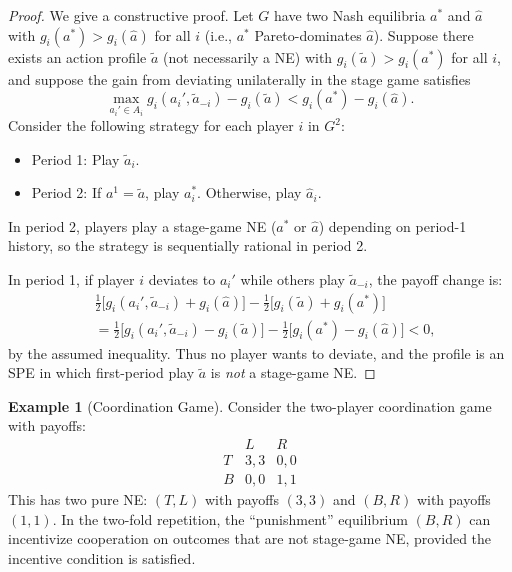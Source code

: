 \documentclass[11pt,a4paper]{article}
\theoremstyle{definition}
\newtheorem{example}{Example}[section]
\theoremstyle{plain}
\theoremstyle{remark}
\begin{document}
\begin{proof}
We give a constructive proof. Let $G$ have two Nash equilibria $a^*$ and $\hat{a}$ with
$g_i(a^*) > g_i(\hat{a})$ for all $i$ (i.e., $a^*$ Pareto-dominates $\hat{a}$). Suppose
there exists an action profile $\tilde{a}$ (not necessarily a NE) with
$g_i(\tilde{a}) > g_i(a^*)$ for all $i$, and suppose the gain from deviating unilaterally
in the stage game satisfies
\[
    \max_{a_i' \in A_i} g_i(a_i', \tilde{a}_{-i}) - g_i(\tilde{a})
    < g_i(a^*) - g_i(\hat{a}).
\]
Consider the following strategy for each player $i$ in $G^2$:
\begin{itemize}
    \item Period 1: Play $\tilde{a}_i$.
    \item Period 2: If $a^1 = \tilde{a}$, play $a_i^*$. Otherwise, play $\hat{a}_i$.
\end{itemize}

In period 2, players play a stage-game NE ($a^*$ or $\hat{a}$) depending on period-1
history, so the strategy is sequentially rational in period 2.

In period 1, if player $i$ deviates to $a_i'$ while others play $\tilde{a}_{-i}$, the
payoff change is:
\begin{align*}
    &\frac{1}{2}\bigl[g_i(a_i', \tilde{a}_{-i}) + g_i(\hat{a})\bigr]
    - \frac{1}{2}\bigl[g_i(\tilde{a}) + g_i(a^*)\bigr] \\
    &= \frac{1}{2}\bigl[g_i(a_i', \tilde{a}_{-i}) - g_i(\tilde{a})\bigr]
    - \frac{1}{2}\bigl[g_i(a^*) - g_i(\hat{a})\bigr] < 0,
\end{align*}
by the assumed inequality. Thus no player wants to deviate, and the profile is an SPE
in which first-period play $\tilde{a}$ is \emph{not} a stage-game NE.
\end{proof}

\begin{example}[Coordination Game]
\label{ex:coordination-repeated}
Consider the two-player coordination game with payoffs:
\[
\begin{array}{c|cc}
  & L & R \\ \hline
T & 3,3 & 0,0 \\
B & 0,0 & 1,1
\end{array}
\]
This has two pure NE: $(T,L)$ with payoffs $(3,3)$ and $(B,R)$ with payoffs $(1,1)$.
In the two-fold repetition, the ``punishment'' equilibrium $(B,R)$ can incentivize
cooperation on outcomes that are not stage-game NE, provided the incentive condition is
satisfied.
\end{example}
\end{document}
